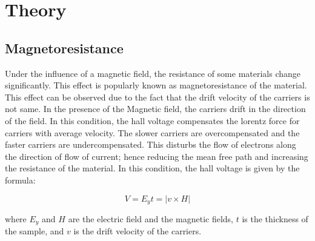 \section{Theory}
    \subsection{Magnetoresistance}
		Under the influence of a magnetic field, the resistance of some materials change significantly. This effect is popularly known as magnetoresistance of the material. This effect can be observed due to the fact that the drift velocity of the carriers is not same. In the presence of the Magnetic field, the carriers drift in the direction of the field. In this condition, the hall voltage compensates the lorentz force for carriers with average velocity. The slower carriers are overcompensated and the faster carriers are undercompensated. This disturbs the flow of electrons along the direction of flow of current; hence reducing the mean free path and increasing the resistance of the material. In this condition, the hall voltage is given by the formula:
		
		$$V = E_yt = |v\times H|$$

		where $E_y$ and $H$ are the electric field and the magnetic fields, $t$ is the thickness of the sample, and $v$ is the drift velocity of the carriers.

		